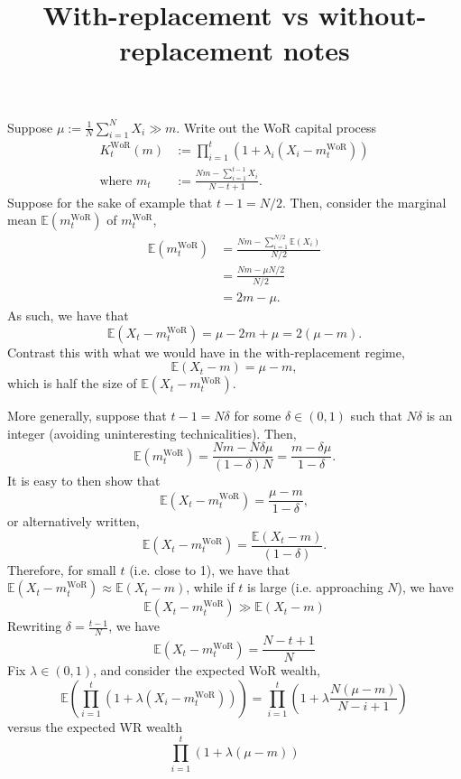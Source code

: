 \documentclass[10pt]{article}
\title{With-replacement vs without-replacement notes}
\author{}
\date{}
\newcommand{\EE}{\mathbb E}
\newcommand{\wor}{\mathrm{WoR}}
\begin{document}
\maketitle

Suppose $\mu := \frac{1}{N} \sum_{i=1}^N X_i \gg m$. Write out the WoR capital
process
\begin{align*}
  K_t^\wor(m) &:= \prod_{i=1}^t(1 + \lambda_i(X_i - m_t^\wor))\\
  \text{where } m_t &:= \frac{Nm - \sum_{i=1}^{t-1} X_i }{N - t + 1}.
\end{align*}
Suppose for the sake of example that $t - 1 = N/2$. Then, consider the marginal mean
$\EE(m_t^\wor)$ of $m_t^\wor$,
\begin{align*}
  \EE (m_t^\wor) &= \frac{Nm - \sum_{i=1}^{N/2}\EE(X_i) }{N/2} \\
      &= \frac{Nm - \mu N/2}{N/2} \\
      &=2m - \mu.
\end{align*}
As such, we have that
\[ \EE(X_t - m_t^\wor) = \mu - 2m + \mu = 2(\mu - m). \]
Contrast this with what we would have in the with-replacement regime,
\[ \EE(X_t - m) = \mu - m, \]
which is half the size of $\EE(X_t - m_t^\wor)$.

More generally, suppose that $t - 1 = N\delta$ for some $\delta \in (0, 1)$ such
that $N\delta$ is an integer (avoiding uninteresting technicalities). Then,
\[ \EE (m_t^\wor) = \frac{Nm - N\delta \mu}{(1-\delta)N} = \frac{m - \delta\mu}{1-\delta}. \]
It is easy to then show that
\[ \EE (X_t - m_t^\wor) = \frac{\mu - m}{1-\delta},\]
or alternatively written,
\[ \EE(X_t - m_t^\wor) = \frac{\EE(X_t - m)}{(1-\delta)}. \]
Therefore, for small $t$ (i.e. close to 1), we have that
$\EE(X_t - m_t^\wor) \approx \EE(X_t - m)$, while if $t$ is large (i.e.
approaching $N$), we have
\[ \EE(X_t - m_t^\wor) \gg \EE(X_t - m) \]
Rewriting $\delta = \frac{t-1}{N}$, we have
\[ \EE(X_t - m_t^\wor) = \frac{N - t + 1}{N} \]
Fix $\lambda \in (0, 1)$, and consider the expected WoR wealth,
\[ \EE \left (  \prod_{i=1}^t (1 + \lambda(X_i - m_t^\wor)) \right ) = \prod_{i=1}^t \left ( 1 + \lambda\frac{N(\mu - m)}{N - i+1} \right  )\]
versus the expected WR wealth
\[ \prod_{i=1}^t \left ( 1 + \lambda(\mu - m) \right  )\]
\end{document}

